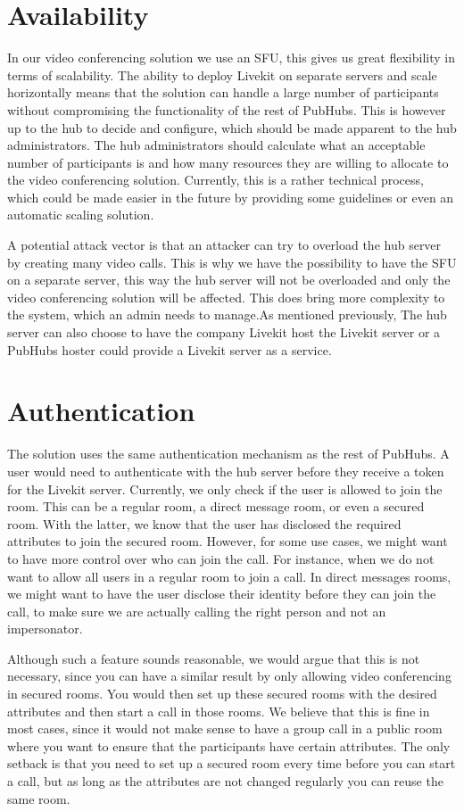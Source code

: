 \documentclass{report}
\begin{document}
\section{Availability}
In our video conferencing solution we use an SFU, this gives us great flexibility in terms of scalability. The
ability to deploy Livekit on separate servers and scale horizontally means that the solution can handle a large
number of participants without compromising the functionality of the rest of PubHubs. This is however up to the hub
to decide and configure, which should be made apparent to the hub administrators. The hub administrators should
calculate what an acceptable number of participants is and how many resources they are willing to allocate to the
video conferencing solution. Currently, this is a rather technical process, which could be made easier in the future
by providing some guidelines or even an automatic scaling solution.

A potential attack vector is that an attacker can try to overload the hub server by creating many video calls. This
is why we have the possibility to have the SFU on a separate server, this way the hub server will not be overloaded
and only the video conferencing solution will be affected. This does bring more complexity to the system, which an
admin needs to manage.As mentioned previously, The hub server can also choose to have the company Livekit host the
Livekit server or a PubHubs hoster could provide a Livekit server as a service.

\section{Authentication}
The solution uses the same authentication mechanism as the rest of PubHubs. A user would need to authenticate with the
hub server before they receive a token for the Livekit server. Currently, we only check if the user is allowed to
join the room. This can be a regular room, a direct message room, or even a secured room. With the latter, we know
that the user has disclosed the required attributes to join the secured room. However, for some use cases, we might
want to have more control over who can join the call. For instance, when we do not want to allow all users in a
regular room to join a call. In direct messages rooms, we might want to have the user disclose their identity
before they can join the call, to make sure we are actually calling the right person and not an impersonator.

Although such a feature sounds reasonable, we would argue that this is not necessary, since you can have a similar
result by only allowing video conferencing in secured rooms. You would then set up these secured rooms with the
desired attributes and then start a call in those rooms. We believe that this is fine in most cases, since it would
not make sense to have a group call in a public room where you want to ensure that the participants have certain attributes.
The only setback is that you need to set up a secured room every time before you can start a call, but as long as the
attributes are not changed regularly you can reuse the same room.
\end{document}
